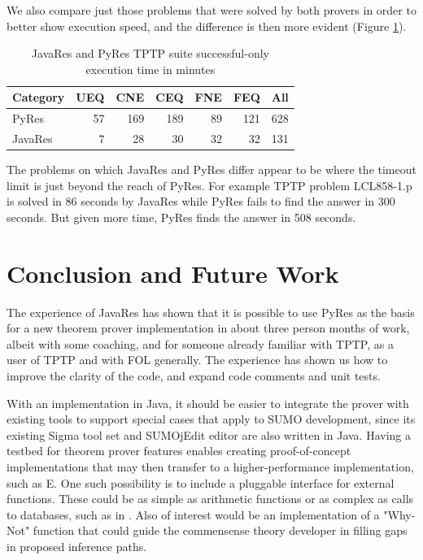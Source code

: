 \documentclass{llncs}
\begin{document}
We also compare just those problems that were solved by both provers in order to better show execution speed,
and the difference is then more evident (Figure \ref{tab:res3}).

\begin{table}[tbh]
  \begin{tabular}{lrrrrrr}
    \hline
    \textbf{Category} & \textbf{UEQ} & \textbf{CNE} & \textbf{CEQ} & \textbf{FNE} & \textbf{FEQ} & \textbf{All}\\
    \hline
    PyRes     &   57 &  169 &   189 &   89 &   121 &  628 \\
    JavaRes   &   7 &   28 &   30 &   32 &   32 &  131 \\
    \hline
  \end{tabular}
  \caption{JavaRes and PyRes TPTP suite successful-only execution time in minutes}
  \label{tab:res3}
\end{table}

The problems on which JavaRes and PyRes differ appear to be where the timeout limit is just beyond
the reach of PyRes.  For example TPTP problem LCL858-1.p is solved in 86 seconds by JavaRes while
PyRes fails to find the answer in 300 seconds.  But given more time, PyRes finds the answer in 508 seconds.


\section{Conclusion and Future Work}

The experience of JavaRes has shown that it is possible to use PyRes
as the basis for a new theorem prover implementation in about three
person months of work, albeit with some coaching, and for someone
already familiar with TPTP, as a user of TPTP and with FOL generally.
The experience has shown us how to improve the clarity of the code,
and expand code comments and unit tests.

With an implementation in Java, it should be easier to integrate the
prover with existing tools to support special cases that apply to SUMO
development, since its existing Sigma tool set \cite{pease2013sigma}
and SUMOjEdit editor \cite{pease2020programmer} are also written in
Java.  Having a testbed for theorem prover features enables creating
proof-of-concept implementations that may then transfer to a
higher-performance implementation, such as E.  One such possibility is
to include a pluggable interface for external functions.  These could
be as simple as arithmetic functions or as complex as calls to
databases, such as in \cite{DBLP:conf/ki/SudaSWLM09}.  Also of
interest would be an implementation of a "Why-Not" function
\cite{10.5555/1650083.1650093} that could guide the commensense theory
developer in filling gaps in proposed inference paths.
\end{document}

